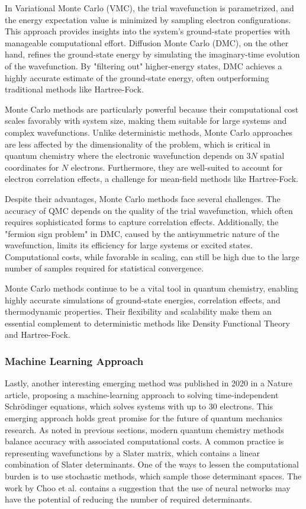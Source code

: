 In Variational Monte Carlo (VMC), the trial wavefunction is parametrized, and the energy expectation value is minimized by sampling electron configurations. This approach provides insights into the system's ground-state properties with manageable computational effort. Diffusion Monte Carlo (DMC), on the other hand, refines the ground-state energy by simulating the imaginary-time evolution of the wavefunction. By "filtering out" higher-energy states, DMC achieves a highly accurate estimate of the ground-state energy, often outperforming traditional methods like Hartree-Fock.

Monte Carlo methods are particularly powerful because their computational cost scales favorably with system size, making them suitable for large systems and complex wavefunctions. Unlike deterministic methods, Monte Carlo approaches are less affected by the dimensionality of the problem, which is critical in quantum chemistry where the electronic wavefunction depends on $3N$ spatial coordinates for $N$ electrons. Furthermore, they are well-suited to account for electron correlation effects, a challenge for mean-field methods like Hartree-Fock.

Despite their advantages, Monte Carlo methods face several challenges. The accuracy of QMC depends on the quality of the trial wavefunction, which often requires sophisticated forms to capture correlation effects. Additionally, the "fermion sign problem" in DMC, caused by the antisymmetric nature of the wavefunction, limits its efficiency for large systems or excited states. Computational costs, while favorable in scaling, can still be high due to the large number of samples required for statistical convergence.

Monte Carlo methods continue to be a vital tool in quantum chemistry, enabling highly accurate simulations of ground-state energies, correlation effects, and thermodynamic properties. Their flexibility and scalability make them an essential complement to deterministic methods like Density Functional Theory and Hartree-Fock.

\subsubsection{Machine Learning Approach}

Lastly, another interesting emerging method was published in 2020 in a Nature article, proposing a machine-learning approach to solving time-independent Schr{\"o}dinger equations, which solves systems with up to 30 electrons. This emerging approach holds great promise for the future of quantum mechanics research. As noted in previous sections, modern quantum chemistry methods balance accuracy with associated computational costs. A common practice is representing wavefunctions by a Slater matrix, which contains a linear combination of Slater determinants. One of the ways to lessen the computational burden is to use stochastic methods, which sample those determinant spaces. The work by Choo et al. contains a suggestion that the use of neural networks may have the potential of reducing the number of required determinants.\cite{choo}

